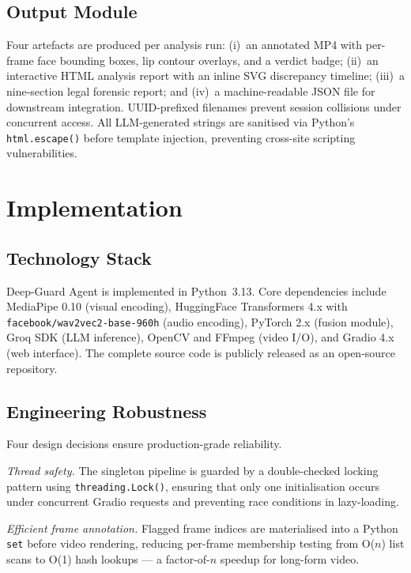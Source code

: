\documentclass[12pt]{article}
\begin{document}
\subsection{Output Module}

Four artefacts are produced per analysis run:
(i)~an annotated MP4 with per-frame face bounding boxes, lip contour overlays,
and a verdict badge;
(ii)~an interactive HTML analysis report with an inline SVG discrepancy timeline;
(iii)~a nine-section legal forensic report; and
(iv)~a machine-readable JSON file for downstream integration.
UUID-prefixed filenames prevent session collisions under concurrent access.
All LLM-generated strings are sanitised via Python's \texttt{html.escape()}
before template injection, preventing cross-site scripting vulnerabilities.

\section{Implementation}

\subsection{Technology Stack}

Deep-Guard Agent is implemented in Python~3.13.
Core dependencies include MediaPipe 0.10 (visual encoding),
HuggingFace Transformers 4.x with \texttt{facebook/wav2vec2-base-960h}
(audio encoding), PyTorch 2.x (fusion module), Groq SDK (LLM inference),
OpenCV and FFmpeg (video I/O), and Gradio 4.x (web interface).
The complete source code is publicly released as an open-source repository.

\subsection{Engineering Robustness}

Four design decisions ensure production-grade reliability.

\textit{Thread safety.}
The singleton pipeline is guarded by a double-checked locking pattern using
\texttt{threading.Lock()}, ensuring that only one initialisation occurs under
concurrent Gradio requests and preventing race conditions in lazy-loading.

\textit{Efficient frame annotation.}
Flagged frame indices are materialised into a Python \texttt{set} before video
rendering, reducing per-frame membership testing from O($n$) list scans to
O(1) hash lookups --- a factor-of-$n$ speedup for long-form video.
\end{document}

